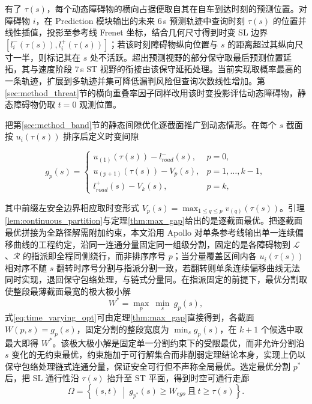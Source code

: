\documentclass[a4paper,zihao=5]{ctexart}
\theoremstyle{definition}
\begin{document}
有了 $\tau(s)$，每个动态障碍物的横向占据便取自其在自车到达时刻的预测位置。对障碍物 $i$，在 Prediction 模块输出的未来 $6$\,s 预测轨迹中查询时刻 $\tau(s)$ 的位置并线性插值，投影至参考线 Frenet 坐标，结合几何尺寸得到时变 SL 边界 $[l_i^{-}(\tau(s)), l_i^{+}(\tau(s))]$；若该时刻障碍物纵向位置与 $s$ 的距离超过其纵向尺寸一半，则标记其在 $s$ 处不活跃。超出预测视野的部分保守取最后预测位置延拓，其与速度阶段 $7$\,s ST 视野的衔接由该保守延拓处理。当前实现取概率最高的一条轨迹，扩展到多轨迹并集可降低漏判风险但查询次数线性增加。第\ref{sec:method_threat}节的横向重叠率因子同样改用该时变投影评估动态障碍物，静态障碍物仍取 $t=0$ 观测位置。

把第\ref{sec:method_band}节的静态间隙优化逐截面推广到动态情形。在每个 $s$ 截面按 $u_i(\tau(s))$ 排序后定义时变间隙

\begin{equation}
    g_p(s) =
    \begin{cases}
        u_{(1)}(\tau(s)) - l_{road}^{-}(s), & p=0, \\[0.3em]
        u_{(p+1)}(\tau(s)) - V_p(s), & p=1,\ldots,k-1, \\[0.3em]
        l_{road}^{+}(s) - V_k(s), & p=k,
    \end{cases}
    \label{eq:time_varying_gap}
\end{equation}

其中前缀左安全边界相应取时变形式 $V_p(s)=\max_{1\leq q\leq p} v_{(q)}(\tau(s))$。引理\ref{lem:continuous_partition}与定理\ref{thm:max_gap}给出的是逐截面最优。把逐截面最优拼接为全路径解需附加约束，本文沿用 Apollo 对单条参考线输出单一连续偏移曲线的工程约定，沿同一连通分量固定同一组级分割，固定的是各障碍物到 $\mathcal{L}$、$\mathcal{R}$ 的指派即全程同侧绕行，而非排序序号 $p$；当分量覆盖区间内各 $u_i(\tau(s))$ 相对序不随 $s$ 翻转时序号分割与指派分割一致，若翻转则单条连续偏移曲线无法同时实现，退回保守包络处理，与链式分量同。在指派固定的前提下，最优分割取使整段最薄截面最宽的极大极小解
\begin{equation}
    W^{*} = \max_{p}\ \min_{s}\ g_p(s),
    \label{eq:time_varying_opt}
\end{equation}
式\eqref{eq:time_varying_opt}可由定理\ref{thm:max_gap}直接得到，各截面 $W(p,s)=g_p(s)$，固定分割的整段宽度为 $\min_s g_p(s)$，在 $k+1$ 个候选中取最大即得 $W^{*}$。该极大极小解是固定单一分割约束下的受限最优，而非允许分割沿 $s$ 变化的无约束最优，约束施加于可行解集合而非削弱定理结论本身，实现上仍以保守包络处理链式连通分量，保证安全可行但不声称全局最优。选定最优分割 $p^{*}$ 后，把 SL 通行性沿 $\tau(s)$ 抬升至 ST 平面，得到时空可通行走廊
\begin{equation}
    \Omega = \left\{ (s,t) \ \middle|\ g_{p^{*}}(s) \geq W_{ego}\ \text{且}\ t \geq \tau(s) \right\}.
    \label{eq:st_corridor}
\end{equation}
\end{document}

